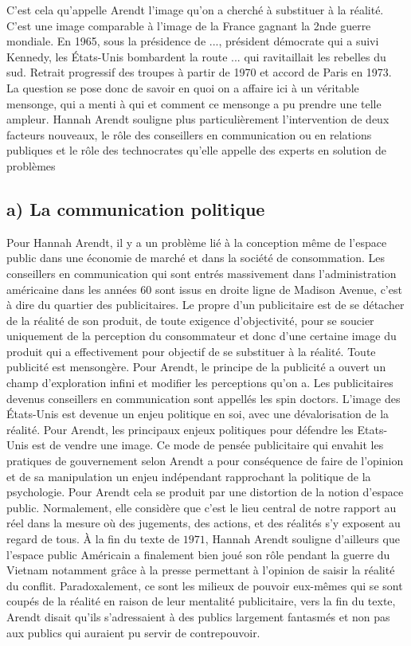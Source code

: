 \documentclass[12pt]{article}
\begin{document}
C'est cela qu'appelle Arendt l'image qu'on a cherché à substituer à la réalité. 
C'est une image comparable à l'image de la France gagnant la 2nde guerre mondiale.
En 1965, sous la présidence de ..., président démocrate qui a suivi Kennedy, les États-Unis bombardent la route ... qui ravitaillait les rebelles du sud.
Retrait progressif des troupes à partir de 1970 et accord de Paris en 1973.
La question se pose donc de savoir en quoi on a affaire ici à un véritable mensonge, qui a menti à qui et comment ce mensonge a pu prendre une telle ampleur.
Hannah Arendt souligne plus particulièrement l'intervention de deux facteurs nouveaux, le rôle des conseillers en communication ou en relations publiques et le rôle des technocrates qu'elle appelle des experts en solution de problèmes
\subsection*{a) La communication politique}
Pour Hannah Arendt, il y a un problème lié à la conception même de l'espace public dans une économie de marché et dans la société de consommation.
Les conseillers en communication qui sont entrés massivement dans l'administration américaine dans les années 60 sont issus en droite ligne de Madison Avenue, c'est à dire du quartier des publicitaires.
Le propre d'un publicitaire est de se détacher de la réalité de son produit, de toute exigence d'objectivité, pour se soucier uniquement de la perception du consommateur et donc d'une certaine image du produit qui a effectivement pour objectif de se substituer à la réalité.
Toute publicité est mensongère.
Pour Arendt, le principe de la publicité a ouvert un champ d'exploration infini et modifier les perceptions qu'on a. Les publicitaires devenus conseillers en communication sont appellés les spin doctors.
L'image des États-Unis est devenue un enjeu politique en soi, avec une dévalorisation de la réalité.
Pour Arendt, les principaux enjeux politiques pour défendre les Etats-Unis est de vendre une image.
Ce mode de pensée publicitaire qui envahit les pratiques de gouvernement selon Arendt a pour conséquence de faire de l'opinion et de sa manipulation un enjeu indépendant rapprochant la politique de la psychologie.
Pour Arendt cela se produit par une distortion de la notion d'espace public.
Normalement, elle considère que c'est le lieu central de notre rapport au réel dans la mesure où des jugements, des actions, et des réalités s'y exposent au regard de tous.
À la fin du texte de $1971$, Hannah Arendt souligne d'ailleurs que l'espace public Américain a finalement bien joué son rôle pendant la guerre du Vietnam notamment grâce à la presse permettant à l'opinion de saisir la réalité du conflit.
Paradoxalement, ce sont les milieux de pouvoir eux-mêmes qui se sont coupés de la réalité en raison de leur mentalité publicitaire, vers la fin du texte, Arendt disait qu'ils s'adressaient à des publics largement fantasmés et non pas aux publics qui auraient pu servir de contrepouvoir.
\end{document}
